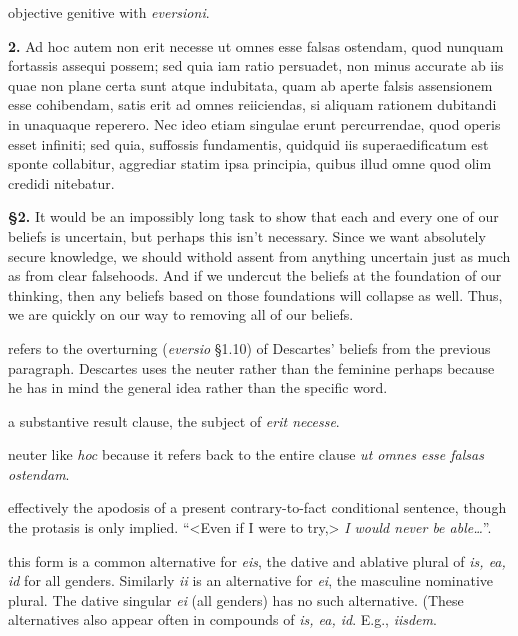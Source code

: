  objective genitive with \textit{eversioni}.


\clearpage

\beginnumbering
\pstart
\begin{latin}
    \textenglish{\textbf{2.}} Ad hoc autem non erit necesse ut omnes esse falsas ostendam, quod nunquam fortassis assequi possem; sed quia iam ratio persuadet, non minus accurate ab iis quae non plane certa sunt atque indubitata, quam ab aperte falsis assensionem esse cohibendam, satis erit ad omnes reiiciendas, si aliquam rationem dubitandi in unaquaque reperero. Nec ideo etiam singulae erunt percurrendae, quod operis esset infiniti; sed quia, suffossis fundamentis, quidquid iis superaedificatum est sponte collabitur, aggrediar statim ipsa principia, quibus illud omne quod olim credidi nitebatur.
\end{latin}
\pend
\endnumbering

\prenotes

\textbf{§2.} It would be an impossibly long task to show that each and every one of our beliefs is uncertain, but perhaps this isn't necessary. Since we want absolutely secure knowledge, we should withold assent from anything uncertain just as much as from clear falsehoods. And if we undercut the beliefs at the foundation of our thinking, then any beliefs based on those foundations will collapse as well. Thus, we are quickly on our way to removing all of our beliefs.

 refers to the overturning (\textit{eversio} §1.10) of Descartes' beliefs from the previous paragraph. Descartes uses the neuter rather than the feminine perhaps because he has in mind the general idea rather than the specific word.

 a substantive result clause, the subject of \textit{erit necesse}.

 neuter like \textit{hoc} because it refers back to the entire clause \textit{ut omnes esse falsas ostendam}.

 effectively the apodosis of a present contrary-to-fact conditional sentence, though the protasis is only implied. ``<Even if I were to try,> \textit{I would never be able\dots}''.

 this form is a common alternative for \textit{eis}, the dative and ablative plural of \textit{is, ea, id} for all genders. Similarly \textit{ii} is an alternative for \textit{ei}, the masculine nominative plural. The dative singular \textit{ei} (all genders) has no such alternative. (These alternatives also appear often in compounds of \textit{is, ea, id}. E.g., \textit{iisdem}.

